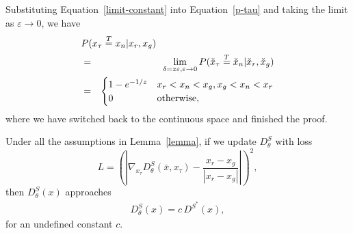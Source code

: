 \documentclass[letterpaper]{article} %
\begin{document}
Substituting Equation~\eqref{limit-constant} into Equation~\eqref{p-tau} and taking the limit as $\varepsilon\rightarrow 0$, we have
\begin{eqnarray}\label{final-p-inter}
\lefteqn{P(x_\tau\overset{T}{=}x_n|x_r,x_g)}\\
&=& \lim_{\delta=z\varepsilon,\varepsilon\rightarrow 0} P(\check{x}_\tau\overset{T}{=}\check{x}_n|\check{x}_r,\check{x}_g) \nonumber\\
    &=&
    \begin{cases}
        1 - e^{-1/z} &\mbox{$x_r<x_n<x_g,x_g<x_n<x_r$}\\
        0 &\mbox{otherwise},
    \end{cases}
\end{eqnarray}
where we have switched back to the continuous space and finished the proof.

\begin{theorem}\label{theorem}
Under all the assumptions in Lemma~\ref{lemma}, if we update $D^S_\theta$ with loss
\begin{equation}\label{loss-d-in-sgan-1}
    L = (|\nabla_{x_{\tau}}D_{\theta}^S(\bar{x},x_{\tau})-\frac{x_{r}-x_{g}}{|x_{r}-x_{g}|}|)^2,
\end{equation}
then $D_{\theta}^S(x)$ approaches
\begin{eqnarray}\label{explain-d}
    D_{\theta}^S (x) = c \, D^{S^\ast}(x),
\end{eqnarray}
for an undefined constant $c$.
\end{theorem}
\end{document}
